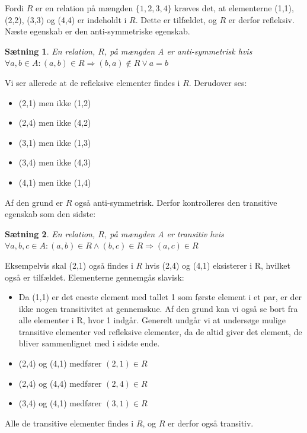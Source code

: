 \documentclass{article}
\newtheorem{theorem}{Sætning}
\begin{document}
Fordi $R$ er en relation på mængden $\{1, 2, 3, 4\}$ kræves det, at elementerne (1,1), (2,2), (3,3) og (4,4) er indeholdt i $R$. Dette er tilfældet, og $R$ er derfor refleksiv. Næste egenskab er den anti-symmetriske egenskab.

\begin{theorem}
En relation, $R$, på mængden A er anti-symmetrisk hvis $\forall a,b \in A : (a,b) \in R \Rightarrow (b,a) \notin R \lor a = b$
\end{theorem}

Vi ser allerede at de refleksive elementer findes i $R$. Derudover ses:

\begin{itemize}
\item (2,1) men ikke (1,2)
\item (2,4) men ikke (4,2)
\item (3,1) men ikke (1,3)
\item (3,4) men ikke (4,3)
\item (4,1) men ikke (1,4)
\end{itemize}

Af den grund er $R$ også anti-symmetrisk. Derfor kontrolleres den transitive egenskab som den sidste:

\begin{theorem}
En relation, $R$, på mængden A er transitiv hvis $\forall a,b,c \in A : (a,b)\in R \land (b,c)\in R \Rightarrow (a,c) \in R$
\end{theorem}

Eksempelvis skal (2,1) også findes i $R$ hvis (2,4) og (4,1) eksisterer i R, hvilket også er tilfældet. Elementerne gennemgås slavisk:

\begin{itemize}
\item Da (1,1) er det eneste element med tallet 1 som første element i et par, er der ikke nogen transitivitet at gennemskue. Af den grund kan vi også se bort fra alle elementer i R, hvor 1 indgår. Generelt undgår vi at undersøge mulige transitive elementer ved refleksive elementer, da de altid giver det element, de bliver sammenlignet med i sidste ende.
\item (2,4) og (4,1) medfører $(2,1) \in R$ \checkmark
\item (2,4) og (4,4) medfører $(2,4) \in R$ \checkmark
\item (3,4) og (4,1) medfører $(3,1) \in R$ \checkmark
\end{itemize}

Alle de transitive elementer findes i $R$, og $R$ er derfor også transitiv.
\end{document}
